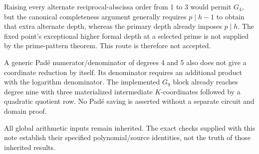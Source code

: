 Raising every alternate reciprocal-abscissa order from 1 to 3 would
permit $G_4$, but the canonical completeness argument generally requires
$p\mid h-1$ to obtain that extra alternate depth, whereas the primary
depth already imposes $p\mid h$.  The fixed point's exceptional higher
formal depth at a selected prime is not supplied by the prime-pattern
theorem.  This route is therefore not accepted.

A generic Pad\'e numerator/denominator of degrees 4 and 5 also does not
give a coordinate reduction by itself.  Its denominator requires an
additional product with the logarithm denominator.  The implemented
$G_9$ block already reaches degree nine with three materialized intermediate
$K$-coordinates followed by a quadratic quotient row.  No Pad\'e saving
is asserted without a separate circuit and domain proof.

All global arithmetic inputs remain inherited.  The exact checks supplied
with this note establish their specified polynomial/source identities,
not the truth of those inherited results.
